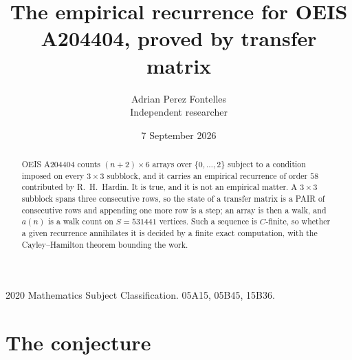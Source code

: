 \documentclass[11pt,a4paper]{article}
\title{The empirical recurrence for OEIS A204404, proved by transfer matrix}
\author{Adrian Perez Fontelles\\ \small Independent researcher}
\date{7 September 2026}
\theoremstyle{plain}
\theoremstyle{definition}
\begin{document}
\maketitle

\begin{abstract}
OEIS A204404 counts $(n+2)\times6$ arrays over $\{0,\dots,2\}$ subject to a condition imposed on
every $3\times3$ subblock, and it carries an empirical recurrence of order $58$
contributed by R.~H.~Hardin. It is true, and it is not an empirical matter. A $3\times3$
subblock spans three consecutive rows, so the state of a transfer matrix is a PAIR of
consecutive rows and appending one more row is a step; an array is then a walk, and
$a(n)$ is a walk count on $S=531441$ vertices. Such a sequence is $C$-finite, so whether a given
recurrence annihilates it is decided by a finite exact computation, with the Cayley--Hamilton
theorem bounding the work.
\end{abstract}

\noindent\small 2020 Mathematics Subject Classification. 05A15, 05B45, 15B36.\normalsize

\section{The conjecture}
\end{document}

